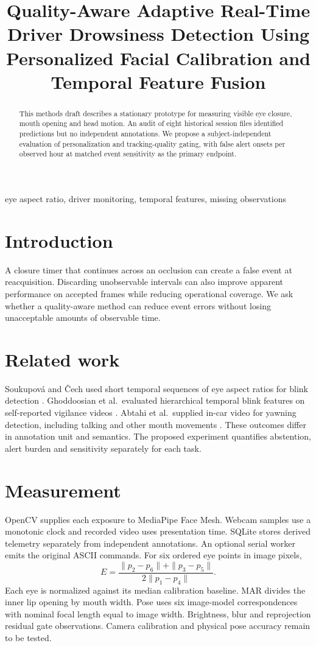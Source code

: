 \documentclass[conference]{IEEEtran}
\title{Quality-Aware Adaptive Real-Time Driver Drowsiness Detection Using Personalized Facial Calibration and Temporal Feature Fusion}
\begin{document}
\maketitle
\begin{abstract}
This methods draft describes a stationary prototype for measuring visible eye closure, mouth opening and head motion. An audit of eight historical session files identified predictions but no independent annotations. We propose a subject-independent evaluation of personalization and tracking-quality gating, with false alert onsets per observed hour at matched event sensitivity as the primary endpoint.
\end{abstract}
\begin{IEEEkeywords}eye aspect ratio, driver monitoring, temporal features, missing observations\end{IEEEkeywords}
\section{Introduction}
A closure timer that continues across an occlusion can create a false event at reacquisition. Discarding unobservable intervals can also improve apparent performance on accepted frames while reducing operational coverage. We ask whether a quality-aware method can reduce event errors without losing unacceptable amounts of observable time.
\section{Related work}
Soukupov\'a and \v{C}ech used short temporal sequences of eye aspect ratios for blink detection \cite{ear}. Ghoddoosian et al.\ evaluated hierarchical temporal blink features on self-reported vigilance videos \cite{uta}. Abtahi et al.\ supplied in-car video for yawning detection, including talking and other mouth movements \cite{yawdd}. These outcomes differ in annotation unit and semantics. The proposed experiment quantifies abstention, alert burden and sensitivity separately for each task.
\section{Measurement}
OpenCV supplies each exposure to MediaPipe Face Mesh. Webcam samples use a monotonic clock and recorded video uses presentation time. SQLite stores derived telemetry separately from independent annotations. An optional serial worker emits the original ASCII commands.
For six ordered eye points in image pixels,
\[
 E=\frac{\|p_2-p_6\|+\|p_3-p_5\|}{2\|p_1-p_4\|}.
\]
Each eye is normalized against its median calibration baseline. MAR divides the inner lip opening by mouth width. Pose uses six image-model correspondences with nominal focal length equal to image width. Brightness, blur and reprojection residual gate observations. Camera calibration and physical pose accuracy remain to be tested.
\end{document}
